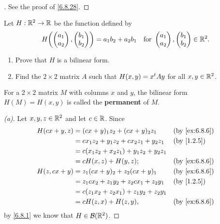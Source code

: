 \begin{proof}[]
  See the proof of \cref{6.8.28}.
\end{proof}

\exercisesection

\setcounter{ex}{5}
\begin{ex}\label{ex:6.8.6}
  Let \(H : \mathbb{R}^2 \to \mathbb{R}\) be the function defined by
  \[
    H\pa{\begin{pmatrix}
        a_1 \\
        a_2
      \end{pmatrix}, \begin{pmatrix}
        b_1 \\
        b_2
      \end{pmatrix}} = a_1 b_2 + a_2 b_1 \quad \text{for } \begin{pmatrix}
      a_1 \\
      a_2
    \end{pmatrix}, \begin{pmatrix}
      b_1 \\
      b_2
    \end{pmatrix} \in \R^2.
  \]
  \begin{enumerate}
    \item Prove that \(H\) is a bilinear form.
    \item Find the \(2 \times 2\) matrix \(A\) such that \(H(x, y) = {x}^{t} A y\) for all \(x, y \in \mathbb{R}^2\).
  \end{enumerate}
  For a \(2 \times 2\) matrix \(M\) with columns \(x\) and \(y\), the bilinear form \(H(M) = H(x, y)\) is called the \textbf{permanent} of \(M\).
\end{ex}

\begin{proof}[(a)]
  Let \(x, y, z \in \mathbb{R}^2\) and let \(c \in \mathbb{R}\).
  Since
  \begin{align*}
    H(cx + y, z) & = (cx + y)_1 z_2 + (cx + y)_2 z_1           &  & \by{ex:6.8.6} \\
                 & = c x_1 z_2 + y_1 z_2 + c x_2 z_1 + y_2 z_1 &  & \by{1.2.5}    \\
                 & = c (x_1 z_2 + x_2 z_1) + y_1 z_2 + y_2 z_1                    \\
                 & = c H(x, z) + H(y, z);                      &  & \by{ex:6.8.6} \\
    H(z, cx + y) & = z_1 (cx + y)_2 + z_2 (cx + y)_1           &  & \by{ex:6.8.6} \\
                 & = z_1 c x_2 + z_1 y_2 + z_2 c x_1 + z_2 y_1 &  & \by{1.2.5}    \\
                 & = c (z_1 x_2 + z_2 x_1) + z_1 y_2 + z_2 y_1                    \\
                 & = c H(z, x) + H(z, y),                      &  & \by{ex:6.8.6}
  \end{align*}
  by \cref{6.8.1} we know that \(H \in \mathcal{B}(\mathbb{R}^2)\).
\end{proof}

